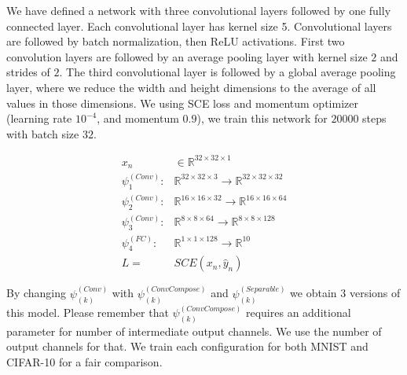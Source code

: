 We have defined a network with three convolutional layers followed by one fully connected layer. Each convolutional layer has kernel size 5. Convolutional layers are followed by batch normalization, then ReLU activations. First two convolution layers are followed by an average pooling layer with kernel size $2$ and strides of $2$. The third convolutional layer is followed by a global average pooling layer, where we reduce the width and height dimensions to the average of all values in those dimensions. We using SCE loss and momentum optimizer (learning rate $10^{-4}$, and momentum $0.9$), we train this network for $20000$ steps with batch size $32$. 

\begin{equation*}
\begin{split}
x_n &\in \mathbb{R}^{32 \times 32 \times 1}\\
\psi_1^{(Conv)}:& \mathbb{R}^{32 \times 32 \times 3} \rightarrow \mathbb{R}^{32 \times 32 \times 32} \\
\psi_2^{(Conv)}:& \mathbb{R}^{16 \times 16 \times 32} \rightarrow \mathbb{R}^{16 \times 16 \times 64} \\
\psi_3^{(Conv)}:& \mathbb{R}^{8 \times 8 \times 64} \rightarrow \mathbb{R}^{8 \times 8 \times 128} \\
\psi_4^{(FC)}:& \mathbb{R}^{1 \times 1 \times 128} \rightarrow \mathbb{R}^{10} \\
L =& SCE(x_n, \hat y_n)
\end{split}
\end{equation*}

By changing $\psi_{(k)}^{(Conv)}$ with $\psi_{(k)}^{(ConvCompose)}$ and $\psi_{(k)}^{(Separable)}$ we obtain 3 versions of this model. Please remember that $\psi_{(k)}^{(ConvCompose)}$ requires an additional parameter for number of intermediate output channels. We use the number of output channels for that. We train each configuration for both MNIST and CIFAR-10 for a fair comparison.

